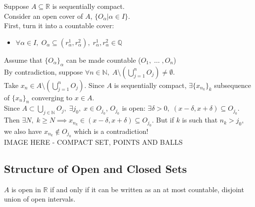 \documentclass[11pt]{article}
\newcommand{\0}{\emptyset}
\newcommand{\N}{\mathbb{N}}
\newcommand{\Q}{\mathbb{Q}}
\newcommand{\R}{\mathbb{R}}
\begin{document}
\begin{itemize}
\label{sec:org8b89e72}
Suppose \(A\subseteq\R\) is sequentially compact.\\[0pt]
Consider an open cover of \(A\), \(\{O_{\alpha}|\alpha\in I\}\).\\[0pt]
First, turn it into a countable cover:\\[0pt]
\begin{itemize}
\item \(\forall\alpha\in I,\;O_{\alpha}\subseteq\left( r^{1}_{\alpha},r^{2}_{\alpha} \right) ,\;r^{1}_{\alpha},r^{2}_{\alpha}\in\Q\)\\[0pt]
\end{itemize}
Assume that \(\{O_{\alpha}\}_{\alpha}\) can be made countable (\(O_{1},\;\ldots\;,O_{n}\))\\[0pt]
By contradiction, suppose \(\forall n\in\N,\;A\setminus\left( \bigcup_{j=1}^{n}O_{j} \right) \neq \0\).\\[0pt]
Take \(x_{n}\in A\setminus\left( \bigcup_{j=1}^{n}O_{j} \right)\). Since \(A\) is sequentially compact, \(\exists \{x_{n_{k}}\}_{k}\) subsequence of \(\{x_{n}\}_{n}\) converging to \(x\in A\).\\[0pt]
Since \(A\subset\bigcup_{j\in\N}O_{j},\;\exists j_{0},\;x\in O_{j_{0}}\), \(O_{j_{0}}\) is open: \(\exists\delta>0,\;(x-\delta,x+\delta)\subseteq O_{j_{0}}\).\\[0pt]
Then \(\exists N,\;k\geq N\implies x_{n_{k}}\in(x-\delta,x+\delta)\subseteq O_{j_{0}}\). But if \(k\) is such that \(n_{k}>j_{0}\), we also have \(x_{n_{k}}\not\in O_{j_{0}}\) which is a contradiction!\\[0pt]
IMAGE HERE - COMPACT SET, POINTS AND BALLS\\[0pt]
\end{itemize}
\subsection*{Structure of Open and Closed Sets}
\label{sec:org556f331}
\(A\) is open in \(\R\) if and only if it can be written as an at most countable, disjoint union of open intervals.\\[0pt]
\end{document}
